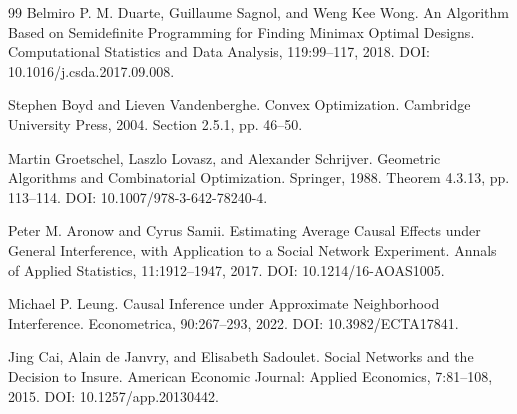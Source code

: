 \documentclass{article}
\begin{document}
\begin{thebibliography}{99}
   Belmiro P. M. Duarte, Guillaume Sagnol, and Weng Kee Wong. An Algorithm Based on Semidefinite Programming for Finding Minimax Optimal Designs. Computational Statistics and Data Analysis, 119:99--117, 2018. DOI: 10.1016/j.csda.2017.09.008.

   Stephen Boyd and Lieven Vandenberghe. Convex Optimization. Cambridge University Press, 2004. Section 2.5.1, pp. 46–50.

   Martin Groetschel, Laszlo Lovasz, and Alexander Schrijver. Geometric Algorithms and Combinatorial Optimization. Springer, 1988. Theorem 4.3.13, pp. 113–114. DOI: 10.1007/978-3-642-78240-4.

   Peter M. Aronow and Cyrus Samii. Estimating Average Causal Effects under General Interference, with Application to a Social Network Experiment. Annals of Applied Statistics, 11:1912--1947, 2017. DOI: 10.1214/16-AOAS1005.

   Michael P. Leung. Causal Inference under Approximate Neighborhood Interference. Econometrica, 90:267--293, 2022. DOI: 10.3982/ECTA17841.

   Jing Cai, Alain de Janvry, and Elisabeth Sadoulet. Social Networks and the Decision to Insure. American Economic Journal: Applied Economics, 7:81--108, 2015. DOI: 10.1257/app.20130442.

\end{thebibliography}
\end{document}
